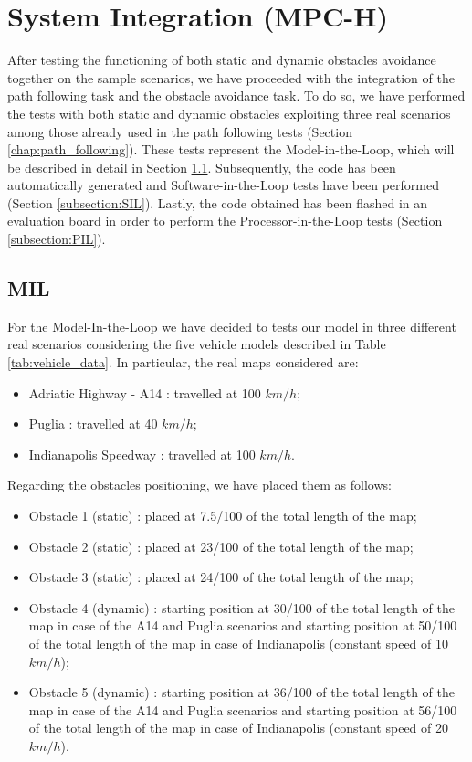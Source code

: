 \section{System Integration (MPC-H)}
After testing the functioning of both static and dynamic obstacles avoidance together on the sample scenarios, we have proceeded with the integration of the path following task and the obstacle avoidance task. To do so, we have performed the tests with both static and dynamic obstacles exploiting three real scenarios among those already used in the path following tests (Section \ref{chap:path_following}). These tests represent the Model-in-the-Loop, which will be described in detail in Section \ref{subsection:MIL}.
Subsequently, the code has been automatically generated and Software-in-the-Loop tests have been performed (Section \ref{subsection:SIL}). Lastly, the code obtained has been flashed in an evaluation board in order to perform the Processor-in-the-Loop tests (Section \ref{subsection:PIL}).

\subsection{MIL} \label{subsection:MIL}
For the Model-In-the-Loop we have decided to tests our model in three different real scenarios considering the five vehicle models described in Table \ref{tab:vehicle_data}. In particular, the real maps considered are:
\begin{itemize}
    \item Adriatic Highway - A14 : travelled at 100 $km/h$;
    \item Puglia : travelled at 40 $km/h$;
    \item Indianapolis Speedway : travelled at 100 $km/h$.
\end{itemize}
Regarding the obstacles positioning, we have placed them as follows:
\begin{itemize}
    \item Obstacle 1 (static) : placed at 7.5/100 of the total length of the map;
    \item Obstacle 2 (static) : placed at 23/100 of the total length of the map;
    \item Obstacle 3 (static) : placed at 24/100 of the total length of the map;
    \item Obstacle 4 (dynamic) : starting position at 30/100 of the total length of the map in case of the A14 and Puglia scenarios and starting position at 50/100 of the total length of the map in case of Indianapolis (constant speed of 10 $km/h$);
    \item Obstacle 5 (dynamic) : starting position at 36/100 of the total length of the map in case of the A14 and Puglia scenarios and starting position at 56/100 of the total length of the map in case of Indianapolis (constant speed of 20 $km/h$).
\end{itemize}

